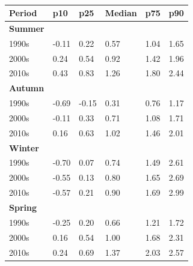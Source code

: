 \begin{table}[h]
	\centering
	\begin{tabularx}{.8\textwidth}{@{}XXXXXX@{}}
		\toprule
		\textbf{Period} & \textbf{p10} & \textbf{p25} & \textbf{Median} & \textbf{p75} & \textbf{p90} \\ \midrule
		\textbf{Summer} &              &              &                 &              &              \\
		1990s           & -0.11        & 0.22         & 0.57            & 1.04         & 1.65         \\
		2000s           & 0.24         & 0.54         & 0.92            & 1.42         & 1.96         \\
		2010s           & 0.43         & 0.83         & 1.26            & 1.80         & 2.44         \\
		\textbf{Autumn} &              &              &                 &              &              \\
		1990s           & -0.69        & -0.15        & 0.31            & 0.76         & 1.17         \\
		2000s           & -0.11        & 0.33         & 0.71            & 1.08         & 1.71         \\
		2010s           & 0.16         & 0.63         & 1.02            & 1.46         & 2.01         \\
		\textbf{Winter} &              &              &                 &              &              \\
		1990s           & -0.70        & 0.07         & 0.74            & 1.49         & 2.61         \\
		2000s           & -0.55        & 0.13         & 0.80            & 1.65         & 2.69         \\
		2010s           & -0.57        & 0.21         & 0.90            & 1.69         & 2.99         \\
		\textbf{Spring} &              &              &                 &              &              \\
		1990s           & -0.25        & 0.20         & 0.66            & 1.21         & 1.72         \\
		2000s           & 0.16         & 0.54         & 1.00            & 1.68         & 2.31         \\
		2010s           & 0.24         & 0.69         & 1.37            & 2.03         & 2.57         \\ \bottomrule
	\end{tabularx}
	\caption{}
	\label{table:distribuzione_anomalie}
\end{table}

